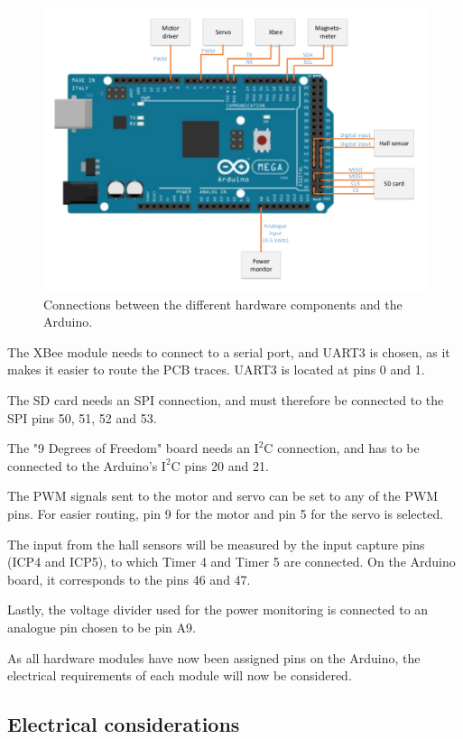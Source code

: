 \begin{figure}[H]
	\centering
	\includegraphics[scale=0.75]{figures/MegaSetup.pdf}
	\caption{Connections between the different hardware components and the Arduino.}
	\label{MegaSetup}
\end{figure}

The XBee module needs to connect to a serial port, and UART3 is chosen, as it makes it easier to route the PCB traces. UART3 is located at pins 0 and 1. 

The SD card needs an SPI connection, and must therefore be connected to the SPI pins 50, 51, 52 and 53. 

The "9 Degrees of Freedom" board needs an $\text{I}^2\text{C}$ connection, and has to be connected to the Arduino's $\text{I}^2\text{C}$ pins 20 and 21. 

The PWM signals sent to the motor and servo can be set to any of the PWM pins. For easier routing, pin 9 for the motor and pin 5 for the servo is selected.

The input from the hall sensors will be measured by the input capture pins (ICP4 and ICP5), to which Timer 4 and Timer 5 are connected. On the Arduino board, it corresponds to the pins 46 and 47.

Lastly, the voltage divider used for the power monitoring is connected to an analogue pin chosen to be pin A9.

As all hardware modules have now been assigned pins on the Arduino, the electrical requirements of each module will now be considered.

\subsection{Electrical considerations}


